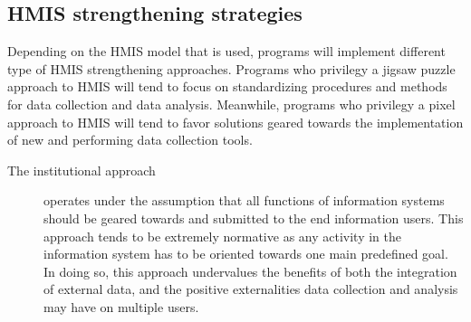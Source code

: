 \subsection{HMIS strengthening strategies}

Depending on the HMIS model that is used, programs will implement different type of HMIS strengthening approaches. Programs who privilegy a jigsaw puzzle approach to HMIS will tend to focus on standardizing procedures and methods for data collection and data analysis. Meanwhile, programs who privilegy a pixel approach to HMIS will tend to favor solutions geared towards the implementation of new and performing data collection tools.

\begin{description}
	\item[The institutional approach] operates under the assumption that all functions of information systems should be geared towards and submitted to the end information users. This approach tends to be extremely normative as any activity in the information system has to be oriented towards one main predefined goal. In doing so, this approach undervalues the benefits of both the integration of external data, and the positive externalities data collection and analysis may have on multiple users.




\end{description}
